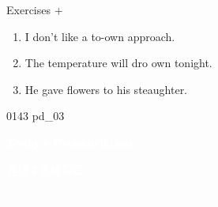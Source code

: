 \documentclass[aspectratio=169,xcolor={dvipsnames,table}]{beamer}
\begin{document}
\begin{frame}[plain]{Exercises  $+$ }
  \Large
  \begin{enumerate}
    \item<2-> I don't like a to-own approach.
    \item<4-> The temperature will dro  own tonight.
    \item<6-> He gave flowers to his steaughter.
  \end{enumerate}

  \hfill{\tiny 0143}\,{\scriptsize {}\,pd\_03}

\end{frame}
\begin{frame}
  \hypertarget{today}{}
  \centering
  \textcolor{white}{\Huge\bfseries Today's Pronunciation}

  \vspace{30pt}

  \textcolor{white}{\Large 連続する破裂音}

  \textcolor{white}{\Large {} $+$ }
\end{frame}
\end{document}
